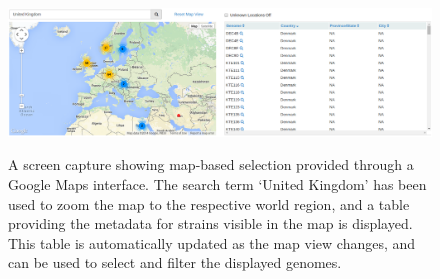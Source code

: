 \documentclass[doublespacing, linenumbers]{bmcart}
\begin{document}
\begin{backmatter}
\newpage
\begin{landscape}
\begin{figure}[h!]
  \includegraphics[width=0.95\columnwidth]{images/uk-map.png}
  \label{fig:map_search}
  \caption{A screen capture showing map-based selection provided through a Google Maps interface.  The search term `United Kingdom' has been used to zoom the map to the respective world region, and a table providing the metadata for strains visible in the map is displayed. This table is automatically updated as the map view changes, and can be used to select and filter the displayed genomes.}
\end{figure}
\end{landscape}



\end{backmatter}
\end{document}
